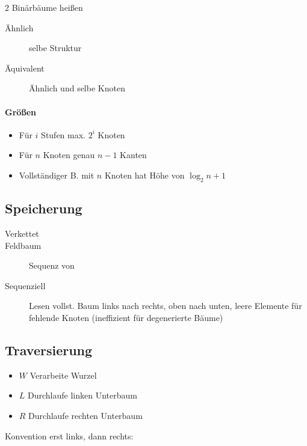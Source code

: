 $2$ Binärbäume hei\ss en

\begin{description}
  \item[Ähnlich] selbe Struktur

  \item[Äquivalent] Ähnlich und selbe Knoten
\end{description}

\paragraph{Grö\ss en}

\begin{itemize}
  \item Für $i$ Stufen max. $2^i$ Knoten
  \item Für $n$ Knoten genau $n - 1$ Kanten
  \item Vollständiger B. mit $n$ Knoten hat Höhe von $\log_2 n + 1$
\end{itemize}

\subsection{Speicherung}

\begin{description}
  \item[Verkettet] 
  \item[Feldbaum] Sequenz von 
  \item[Sequenziell] Lesen vollst. Baum links nach rechts, oben nach unten, leere Elemente für fehlende Knoten (ineffizient für degenerierte Bäume)
\end{description}

\subsection{Traversierung}

\begin{itemize}
  \item $W$ Verarbeite Wurzel
  \item $L$ Durchlaufe linken Unterbaum
  \item $R$ Durchlaufe rechten Unterbaum
\end{itemize}

Konvention erst links, dann rechts:

